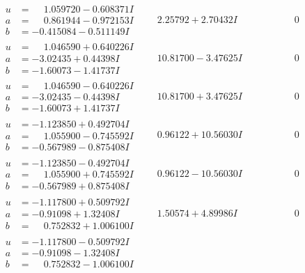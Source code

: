 \documentclass[1p]{elsarticle_modified}
\theoremstyle{definition}
\begin{document}
$$\begin{array}{c|c|c}
\begin{aligned}
u &= \phantom{-}1.059720 - 0.608371 I \\
a &= \phantom{-}0.861944 - 0.972153 I \\
b &= -0.415084 - 0.511149 I\end{aligned}
 & \phantom{-}2.25792 + 2.70432 I & \phantom{-0.000000 } 0 \\ \hline\begin{aligned}
u &= \phantom{-}1.046590 + 0.640226 I \\
a &= -3.02435 + 0.44398 I \\
b &= -1.60073 - 1.41737 I\end{aligned}
 & \phantom{-}10.81700 - 3.47625 I & \phantom{-0.000000 } 0 \\ \hline\begin{aligned}
u &= \phantom{-}1.046590 - 0.640226 I \\
a &= -3.02435 - 0.44398 I \\
b &= -1.60073 + 1.41737 I\end{aligned}
 & \phantom{-}10.81700 + 3.47625 I & \phantom{-0.000000 } 0 \\ \hline\begin{aligned}
u &= -1.123850 + 0.492704 I \\
a &= \phantom{-}1.055900 - 0.745592 I \\
b &= -0.567989 - 0.875408 I\end{aligned}
 & \phantom{-}0.96122 + 10.56030 I & \phantom{-0.000000 } 0 \\ \hline\begin{aligned}
u &= -1.123850 - 0.492704 I \\
a &= \phantom{-}1.055900 + 0.745592 I \\
b &= -0.567989 + 0.875408 I\end{aligned}
 & \phantom{-}0.96122 - 10.56030 I & \phantom{-0.000000 } 0 \\ \hline\begin{aligned}
u &= -1.117800 + 0.509792 I \\
a &= -0.91098 + 1.32408 I \\
b &= \phantom{-}0.752832 + 1.006100 I\end{aligned}
 & \phantom{-}1.50574 + 4.89986 I & \phantom{-0.000000 } 0 \\ \hline\begin{aligned}
u &= -1.117800 - 0.509792 I \\
a &= -0.91098 - 1.32408 I \\
b &= \phantom{-}0.752832 - 1.006100 I\end{aligned}

\end{array}$$
\end{document}

